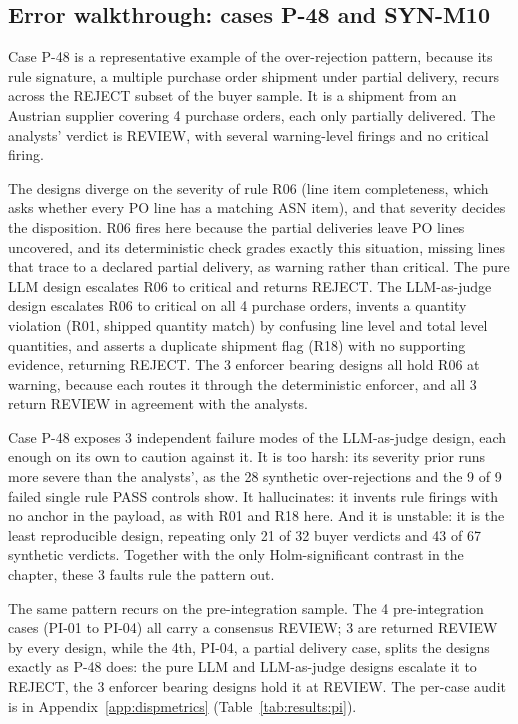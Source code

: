 \subsection{Error walkthrough: cases P-48 and SYN-M10}
\label{sec:results:p48}

Case P-48 is a representative example of the over-rejection pattern, because its rule signature, a multiple purchase order shipment under partial delivery, recurs across the REJECT subset of the buyer sample. It is a shipment from an Austrian supplier covering 4 purchase orders, each only partially delivered. The analysts' verdict is REVIEW, with several warning-level firings and no critical firing.

The designs diverge on the severity of rule R06 (line item completeness, which asks whether every PO line has a matching ASN item), and that severity decides the disposition. R06 fires here because the partial deliveries leave PO lines uncovered, and its deterministic check grades exactly this situation, missing lines that trace to a declared partial delivery, as warning rather than critical. The pure LLM design escalates R06 to critical and returns REJECT. The LLM-as-judge design escalates R06 to critical on all 4 purchase orders, invents a quantity violation (R01, shipped quantity match) by confusing line level and total level quantities, and asserts a duplicate shipment flag (R18) with no supporting evidence, returning REJECT. The 3 enforcer bearing designs all hold R06 at warning, because each routes it through the deterministic enforcer, and all 3 return REVIEW in agreement with the analysts.

Case P-48 exposes 3 independent failure modes of the LLM-as-judge design, each enough on its own to caution against it. It is too harsh: its severity prior runs more severe than the analysts', as the 28 synthetic over-rejections and the 9 of 9 failed single rule PASS controls show. It hallucinates: it invents rule firings with no anchor in the payload, as with R01 and R18 here. And it is unstable: it is the least reproducible design, repeating only 21 of 32 buyer verdicts and 43 of 67 synthetic verdicts. Together with the only Holm-significant contrast in the chapter, these 3 faults rule the pattern out.


The same pattern recurs on the pre-integration sample. The 4 pre-integration cases (PI-01 to PI-04) all carry a consensus REVIEW; 3 are returned REVIEW by every design, while the 4th, PI-04, a partial delivery case, splits the designs exactly as P-48 does: the pure LLM and LLM-as-judge designs escalate it to REJECT, the 3 enforcer bearing designs hold it at REVIEW. The per-case audit is in Appendix~\ref{app:dispmetrics} (Table~\ref{tab:results:pi}).

